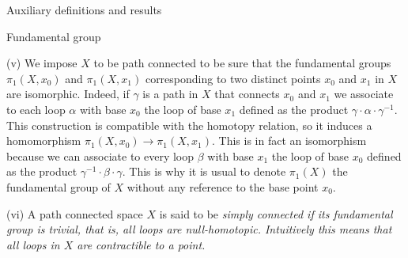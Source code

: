 \documentclass[11pt, a4paper, english, twoside, notitlepage, openright]{report}
\begin{document}
\begin{chapter}{Auxiliary definitions and results}
\begin{section}{Fundamental group}
\begin{definitions}
\vspace{1mm}

(v) We impose $X$ to be path connected to be sure that the fundamental groups $\pi_1(X,x_0)$ and $\pi_1(X,x_1)$ corresponding to two distinct points $x_0$ and $x_1$ in $X$ are isomorphic. Indeed, if $\gamma$ is a path in $X$ that connects $x_0$ and $x_1$ we associate to each loop $\alpha$ with base $x_0$ the loop of base $x_1$ defined as the product $\gamma\cdot\alpha\cdot\gamma^{-1}$. This construction is compatible with the homotopy relation, so it induces a homomorphism $\pi_1(X,x_0)\to\pi_1(X,x_1)$. This is in fact an isomorphism because we can associate to every loop $\beta$ with base $x_1$ the loop of base $x_0$ defined as the product $\gamma^{-1}\cdot\beta\cdot\gamma$. This is why it is usual to denote $\pi_1(X)$ the fundamental group of $X$ without any reference to the base point $x_0$. 
\end{definitions}

\vspace{1mm}

(vi) A path connected space $X$ is said to be \em simply connected \em if its fundamental group is trivial, that is, all loops are null-homotopic. Intuitively this means that all loops in $X$ are contractible to a point.


\end{section}


\end{chapter}
\end{document}
